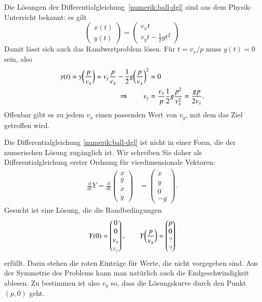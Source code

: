 Die Lösungen der Differentialgleichung~\ref{numerik:ball-dgl} sind aus
dem Physik-Unterricht bekannt:
es gilt
\begin{equation}
\begin{pmatrix}x(t)\\y(t)\end{pmatrix}
=
\begin{pmatrix}v_xt\\ v_yt-\frac12gt^2\end{pmatrix}
\end{equation}
Damit lässt sich auch das Randwertproblem lösen.
Für $t=v_x/p$ muss $y(t)=0$ sein, also
\begin{align}
y(t)=y\biggl(\frac{p}{v_x}\biggr)
=v_y\frac{p}{v_x}-\frac12g\biggl(\frac{p}{v_x}\biggr)^2&=0
\notag
\\
\Rightarrow\qquad
v_y
&=
\frac{v_x}p\frac12g\frac{p^2}{v_x^2}=\frac{gp}{2v_x}.
\label{numerik:ball-bedingung}
\end{align}
Offenbar gibt es zu jedem $v_x$ einen passenden Wert von $v_y$,
mit dem das Ziel getroffen wird.

Die Differentialgleichung \eqref{numerik:ball-dgl} ist nicht in einer
Form, die der numerischen Lösung zugänglich ist.
Wir schreiben Sie daher als Differentialgleichung erster Ordnung 
für vierdimensionale Vektoren:
\begin{align}
\frac{d}{dt}Y
=
\frac{d}{dt}\begin{pmatrix}x\\y\\\dot x\\\dot y\end{pmatrix}
&=
\begin{pmatrix}\dot x\\\dot y\\ 0\\ -g\end{pmatrix}.
\label{numerik:ball-dgl-1}
\end{align}
Gesucht ist eine Lösung, die die Randbedingungen
\begin{equation}
Y(0)
=
\begin{pmatrix}0\\0\\v_x\\\color{red}v_y\end{pmatrix},
\qquad
Y\biggl(\frac{p}{v_x}\biggr)
=
\begin{pmatrix}p\\0\\\color{red}?\\\color{red}?\end{pmatrix}
\label{numerik:ball-dgl-2}
\end{equation}
erfüllt.
Darin stehen die roten Einträge für Werte, die nicht vorgegeben sind.
Aus der Symmetrie des Problems kann man natürlich auch die Endgeschwindigkeit
ablesen.
Zu bestimmen ist also $v_y$ so, dass die Lösungskurve durch den Punkt
$(p,0)$ geht.

